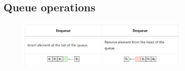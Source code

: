 \documentclass{article}
\begin{document}
\subsection{Queue operations}

\begin{figure}[!ht]
    \centering
    \includegraphics*[width=0.75\textwidth]{images/queue_operations.png}
\end{figure}

% 
\end{document}
